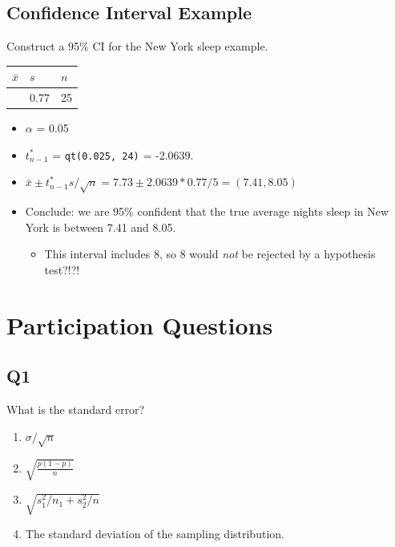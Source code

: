 \documentclass[
  letterpaper,
  DIV=11,
  numbers=noendperiod,
  oneside]{scrreprt}
\providecommand{\tightlist}{%
  \setlength{\itemsep}{0pt}\setlength{\parskip}{0pt}}\usepackage{longtable,booktabs,array}
\begin{document}
\hypertarget{confidence-interval-example}{%
\subsection{Confidence Interval
Example}\label{confidence-interval-example}}

Construct a 95\% CI for the New York sleep example.

\begin{longtable}[]{@{}lll@{}}
\toprule\noalign{}
\(\bar x\) & \(s\) & \(n\) \\
\midrule\noalign{}
\endhead
\bottomrule\noalign{}
\endlastfoot
7.73 & 0.77 & 25 \\
\end{longtable}

\begin{itemize}
\tightlist
\item
  \(\alpha\) = 0.05\lspace
\item
  \(t^*_{n-1}\) = \pause \texttt{qt(0.025,\ 24)} = -2.0639.\lspace
\item
  \(\bar x \pm t^*_{n-1}s/\sqrt{n} = 7.73 \pm 2.0639*0.77/5 = (7.41, 8.05)\)\lspace
\item
  Conclude: we are 95\% confident that the true average nights sleep in
  New York is between 7.41 and 8.05.

  \begin{itemize}
  \tightlist
  \item
    This interval includes 8, so 8 would \emph{not} be rejected by a
    hypothesis test?!?!
  \end{itemize}
\end{itemize}

\hypertarget{participation-questions-1}{%
\section{Participation Questions}\label{participation-questions-1}}

\hypertarget{q1-1}{%
\subsection{Q1}\label{q1-1}}

What is the standard error?

\pspace

\begin{enumerate}
\def\labelenumi{\arabic{enumi}.}
\tightlist
\item
  \(\sigma/\sqrt{n}\)
\item
  \(\sqrt{\frac{p(1-p)}{n}}\)
\item
  \(\sqrt{s_1^2/n_1 + s_2^2/n}\)
\item
  The standard deviation of the sampling distribution.
\end{enumerate}
\end{document}
